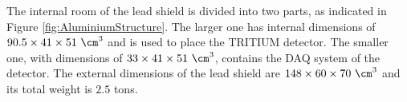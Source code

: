 The internal room of the lead shield is divided into two parts, as indicated in Figure \ref{fig:AluminiumStructure}. The larger one has internal dimensions of $90.5 \times 41 \times 51~\cm^3$ and is used to place the TRITIUM detector. The smaller one, with dimensions of $33 \times 41 \times 51~\cm^3$, contains the DAQ system of the detector. The external dimensions of the lead shield are $148 \times 60 \times 70~\cm^3$ and its total weight is $2.5$ tons.